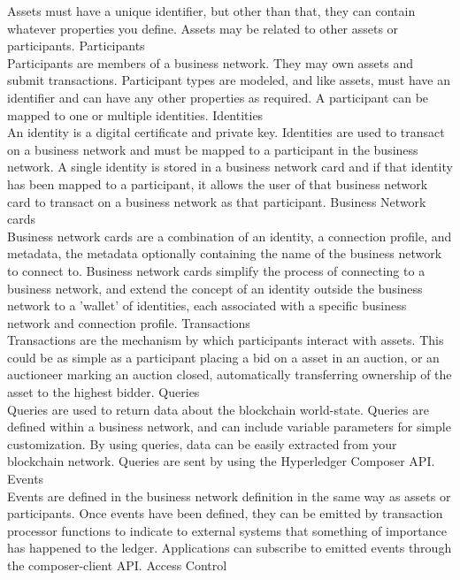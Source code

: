 Assets must have a unique identifier, but other than that, they can contain whatever properties you define. Assets may be related to other assets or participants.
\medskip
Participants\\
Participants are members of a business network. They may own assets and submit transactions. Participant types are modeled, and like assets, must have an identifier and can have any other properties as required. A participant can be mapped to one or multiple identities.
\medskip
Identities\\
An identity is a digital certificate and private key. Identities are used to transact on a business network and must be mapped to a participant in the business network. A single identity is stored in a business network card and if that identity has been mapped to a participant, it allows the user of that business network card to transact on a business network as that participant.
\medskip
Business Network cards\\
Business network cards are a combination of an identity, a connection profile, and metadata, the metadata optionally containing the name of the business network to connect to. Business network cards simplify the process of connecting to a business network, and extend the concept of an identity outside the business network to a 'wallet' of identities, each associated with a specific business network and connection profile.
\medskip
Transactions\\
Transactions are the mechanism by which participants interact with assets. This could be as simple as a participant placing a bid on a asset in an auction, or an auctioneer marking an auction closed, automatically transferring ownership of the asset to the highest bidder.
\medskip
Queries\\
Queries are used to return data about the blockchain world-state. Queries are defined within a business network, and can include variable parameters for simple customization. By using queries, data can be easily extracted from your blockchain network. Queries are sent by using the Hyperledger Composer API.
\medskip
Events\\
Events are defined in the business network definition in the same way as assets or participants. Once events have been defined, they can be emitted by transaction processor functions to indicate to external systems that something of importance has happened to the ledger. Applications can subscribe to emitted events through the composer-client API.
\medskip
Access Control\\

